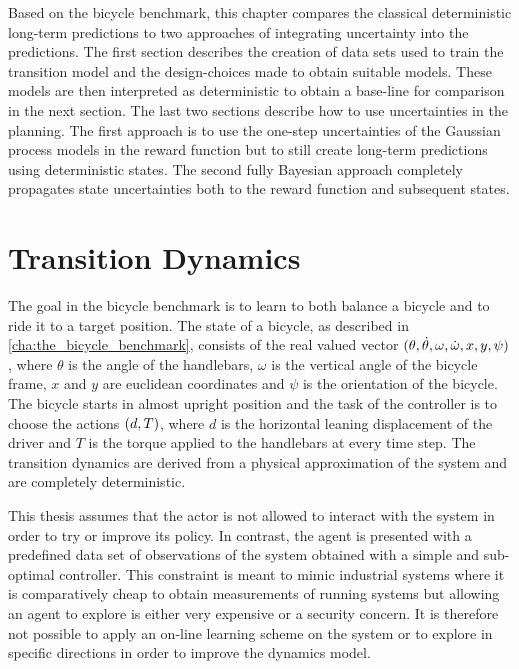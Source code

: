 Based on the bicycle benchmark, this chapter compares the classical deterministic long-term predictions to two approaches of integrating uncertainty into the predictions.
The first section describes the creation of data sets used to train the transition model and the design-choices made to obtain suitable models.
These models are then interpreted as deterministic to obtain a base-line for comparison in the next section.
The last two sections describe how to use uncertainties in the planning.
The first approach is to use the one-step uncertainties of the Gaussian process models in the reward function but to still create long-term predictions using deterministic states.
The second fully Bayesian approach completely propagates state uncertainties both to the reward function and subsequent states.

\section{Transition Dynamics}
\label{sec:transition_dynamics}
The goal in the bicycle benchmark is to learn to both balance a bicycle and to ride it to a target position.
The state of a bicycle, as described in \cref{cha:the_bicycle_benchmark}, consists of the real valued vector $(\theta, \dot{\theta}, \omega, \dot{\omega}, x, y, \psi)$, where $\theta$ is the angle of the handlebars, $\omega$ is the vertical angle of the bicycle frame, $x$ and $y$ are euclidean coordinates and $\psi$ is the orientation of the bicycle.
The bicycle starts in almost upright position and the task of the controller is to choose the actions $(d, T)$, where $d$ is the horizontal leaning displacement of the driver and $T$ is the torque applied to the handlebars at every time step.
The transition dynamics are derived from a physical approximation of the system and are completely deterministic.

This thesis assumes that the actor is not allowed to interact with the system in order to try or improve its policy.
In contrast, the agent is presented with a predefined data set of observations of the system obtained with a simple and sub-optimal controller.
This constraint is meant to mimic industrial systems where it is comparatively cheap to obtain measurements of running systems but allowing an agent to explore is either very expensive or a security concern.
It is therefore not possible to apply an on-line learning scheme on the system or to explore in specific directions in order to improve the dynamics model.

